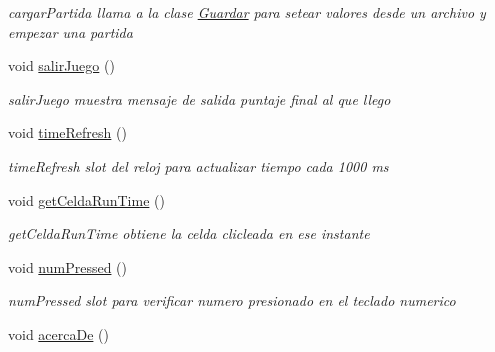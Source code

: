 \begin{DoxyCompactItemize}
\begin{DoxyCompactList}\small\item\em cargar\-Partida llama a la clase \hyperlink{class_guardar}{Guardar} para setear valores desde un archivo y empezar una partida \end{DoxyCompactList}\item 
\hypertarget{class_main_table_aa5e07992f1cacddecc0b447b06ef676e}{void \hyperlink{class_main_table_aa5e07992f1cacddecc0b447b06ef676e}{salir\-Juego} ()}\label{class_main_table_aa5e07992f1cacddecc0b447b06ef676e}

\begin{DoxyCompactList}\small\item\em salir\-Juego muestra mensaje de salida puntaje final al que llego \end{DoxyCompactList}\item 
\hypertarget{class_main_table_a3ec4db19cba39957c9d83b1c631b3f77}{void \hyperlink{class_main_table_a3ec4db19cba39957c9d83b1c631b3f77}{time\-Refresh} ()}\label{class_main_table_a3ec4db19cba39957c9d83b1c631b3f77}

\begin{DoxyCompactList}\small\item\em time\-Refresh slot del reloj para actualizar tiempo cada 1000 ms \end{DoxyCompactList}\item 
\hypertarget{class_main_table_a256cce08eaf6f346f831d83005f7682d}{void \hyperlink{class_main_table_a256cce08eaf6f346f831d83005f7682d}{get\-Celda\-Run\-Time} ()}\label{class_main_table_a256cce08eaf6f346f831d83005f7682d}

\begin{DoxyCompactList}\small\item\em get\-Celda\-Run\-Time obtiene la celda clicleada en ese instante \end{DoxyCompactList}\item 
\hypertarget{class_main_table_a48c9b0d16bf49c557c2d4d424daa6320}{void \hyperlink{class_main_table_a48c9b0d16bf49c557c2d4d424daa6320}{num\-Pressed} ()}\label{class_main_table_a48c9b0d16bf49c557c2d4d424daa6320}

\begin{DoxyCompactList}\small\item\em num\-Pressed slot para verificar numero presionado en el teclado numerico \end{DoxyCompactList}\item 
\hypertarget{class_main_table_a70fc4645efa7708419f7746209adeb7a}{void \hyperlink{class_main_table_a70fc4645efa7708419f7746209adeb7a}{acerca\-De} ()}\label{class_main_table_a70fc4645efa7708419f7746209adeb7a}


\end{DoxyCompactItemize}
